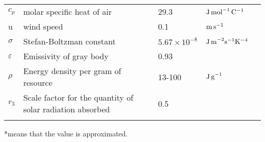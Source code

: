 \begin{sidewaystable}
\begin{tabular}{l l l l l}
$c_p$ & molar specific heat of air  & 29.3 &  $\rm{J \, mol}^ {-1} \, \rm{C}^ {-1}$ & \citet{Campbell2012} \\
u &  wind speed & 0.1 & $\rm{m \, s}^{-1}$ & \\
$\sigma$ & Stefan-Boltzman constant & $5.67 \times 10^{-8}$ &  $\rm{J \, m}^{-2} \rm{s}^{-1} \rm{K}^{-4}  $  &  \\
$\varepsilon$& Emissivity of gray body & 0.93& & \citep{Campbell2012} \\
$\rho$ &Energy density per gram of resource & 13-100 &  $\rm{J \, g}^{-1}$  &  \\  %
$r_3$  & Scale factor for the quantity of solar radiation absorbed & 0.5 &  &  \\
\hline
\label{table:table1}
\end{tabular}
\raggedright{*means that the value is approximated.}
\end{sidewaystable}


